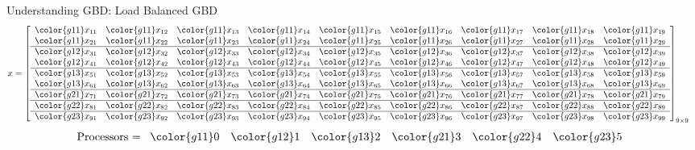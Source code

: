 \begin{frame}
\begin{exampleblock}{Understanding GBD:  Load Balanced GBD}
\begin{align*}
x &= \left[
      \begin{array}{lllllllll}
      \color{g11}x_{11} & \color{g11}x_{12} & \color{g11}x_{13} & \color{g11}x_{14} & \color{g11}x_{15} & \color{g11}x_{16} & \color{g11}x_{17} & \color{g11}x_{18} & \color{g11}x_{19}\\
      \color{g11}x_{21} & \color{g11}x_{22} & \color{g11}x_{23} & \color{g11}x_{24} & \color{g11}x_{25} & \color{g11}x_{26} & \color{g11}x_{27} & \color{g11}x_{28} & \color{g11}x_{29}\\\hline
      \color{g12}x_{31} & \color{g12}x_{32} & \color{g12}x_{33} & \color{g12}x_{34} & \color{g12}x_{35} & \color{g12}x_{36} & \color{g12}x_{37} & \color{g12}x_{38} & \color{g12}x_{39}\\
      \color{g12}x_{41} & \color{g12}x_{42} & \color{g12}x_{43} & \color{g12}x_{44} & \color{g12}x_{45} & \color{g12}x_{46} & \color{g12}x_{47} & \color{g12}x_{48} & \color{g12}x_{49}\\\hline
      \color{g13}x_{51} & \color{g13}x_{52} & \color{g13}x_{53} & \color{g13}x_{54} & \color{g13}x_{55} & \color{g13}x_{56} & \color{g13}x_{57} & \color{g13}x_{58} & \color{g13}x_{59}\\
      \color{g13}x_{61} & \color{g13}x_{62} & \color{g13}x_{63} & \color{g13}x_{64} & \color{g13}x_{65} & \color{g13}x_{66} & \color{g13}x_{67} & \color{g13}x_{68} & \color{g13}x_{69}\\\hline
      \color{g21}x_{71} & \color{g21}x_{72} & \color{g21}x_{73} & \color{g21}x_{74} & \color{g21}x_{75} & \color{g21}x_{76} & \color{g21}x_{77} & \color{g21}x_{78} & \color{g21}x_{79}\\\hline
      \color{g22}x_{81} & \color{g22}x_{82} & \color{g22}x_{83} & \color{g22}x_{84} & \color{g22}x_{85} & \color{g22}x_{86} & \color{g22}x_{87} & \color{g22}x_{88} & \color{g22}x_{89}\\\hline
      \color{g23}x_{91} & \color{g23}x_{92} & \color{g23}x_{93} & \color{g23}x_{94} & \color{g23}x_{95} & \color{g23}x_{96} & \color{g23}x_{97} & \color{g23}x_{98} & \color{g23}x_{99}\\
      \end{array}
\right]_{9\times 9}
\end{align*}
\begin{align*}
\text{Processors = }
      \begin{array}{llllll}
      \color{g11}0 & \color{g12}1 & \color{g13}2 & \color{g21}3 & \color{g22}4 & \color{g23}5
      \end{array}
\end{align*}
\end{exampleblock}
\end{frame}

